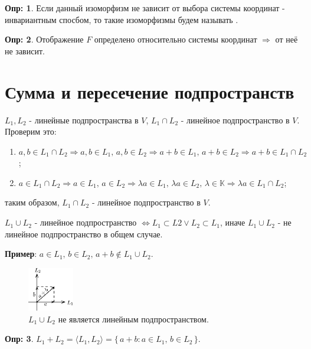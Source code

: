 \documentclass[12pt]{article}
\theoremstyle{definition}
\newtheorem{defn}{Опр:}
\begin{document}
\begin{defn}
	Если данный изоморфизм не зависит от выбора системы координат - инвариантным спосбом, то такие изоморфизмы будем называть .
\end{defn}
\begin{defn}
	Отображение $F$ определено  относительно системы координат $\Rightarrow$ от неё не зависит.
\end{defn}

\section*{Сумма и пересечение подпространств}

$L_1, L_2$ - линейные подпространства в $V$, $L_1 \cap L_2$ - линейное подпространство в $V$. Проверим это:
\begin{enumerate}[label ={(\arabic*)}]
	\item $a,b \in L_1 \cap L_2 \Rightarrow a,b \in L_1, \, a, b \in L_2 \Rightarrow a + b \in L_1, \, a + b \in L_2 \Rightarrow a + b \in L_1 \cap L_2$;
	\item $a \in L_1 \cap L_2 \Rightarrow a \in L_1, \, a \in L_2 \Rightarrow \lambda a \in L_1, \, \lambda a \in L_2, \, \lambda \in \mathbb{K} \Rightarrow \lambda a \in L_1 \cap L_2$;
\end{enumerate}
таким образом, $L_1 \cap L_2$ - линейное подпространство в $V$.

$L_1 \cup L_2$ - линейное подпространство $\Leftrightarrow L_1 \subset L2 \vee L_2 \subset L_1$, иначе $L_1 \cup L_2$ - не линейное подпространство в общем случае.

\textbf{Пример}: $a \in L_1, \, b \in L_2, \, a + b \notin L_1 \cup L_2$.
\begin{figure}[H]
	\centering
	\includegraphics[width=0.18\textwidth]{4_1.eps}
	\caption{$L_1 \cup L_2$ не является линейным подпространством.}
	\label{4_1}
\end{figure}

\begin{defn}
	 $L_1 + L_2 = \langle L_1, L_2 \rangle = \{\, a + b \colon a \in L_1, \, b \in L_2 \,\}$.
\end{defn}
\end{document}
